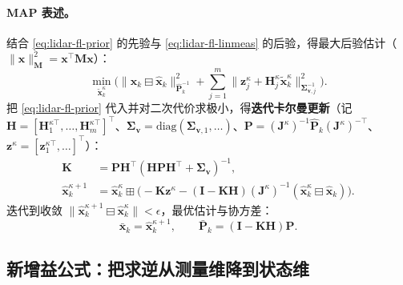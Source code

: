 \paragraph{MAP 表述。}
结合 \cref{eq:lidar-fl-prior} 的先验与 \cref{eq:lidar-fl-linmeas} 的后验，得最大后验估计（$\|\mathbf{x}\|^2_{\mathbf{M}}=\mathbf{x}^\top\mathbf{M}\mathbf{x}$）：
\begin{equation}
  \min_{\tilde{\mathbf{x}}^\kappa_k}\bigg(\big\|\mathbf{x}_k\boxminus\hat{\mathbf{x}}_k\big\|^2_{\hat{\mathbf{P}}_k^{-1}}+\sum_{j=1}^m\big\|\mathbf{z}^\kappa_j+\mathbf{H}^\kappa_j\tilde{\mathbf{x}}^\kappa_k\big\|^2_{\boldsymbol{\Sigma}_{\mathbf{v},j}^{-1}}\bigg).
  \label{eq:lidar-fl-map}
\end{equation}
把 \cref{eq:lidar-fl-prior} 代入并对二次代价求极小，得\textbf{迭代卡尔曼更新}（记 $\mathbf{H}=[\mathbf{H}^{\kappa\top}_1,\dots,\mathbf{H}^{\kappa\top}_m]^\top$、$\boldsymbol{\Sigma}_{\mathbf{v}}=\mathrm{diag}(\boldsymbol{\Sigma}_{\mathbf{v},1},\dots)$、$\mathbf{P}=(\mathbf{J}^\kappa)^{-1}\hat{\mathbf{P}}_k(\mathbf{J}^\kappa)^{-\top}$、$\mathbf{z}^\kappa=[\mathbf{z}^{\kappa\top}_1,\dots]^\top$）：
\begin{align}
  \mathbf{K}&=\mathbf{P}\mathbf{H}^\top(\mathbf{H}\mathbf{P}\mathbf{H}^\top+\boldsymbol{\Sigma}_{\mathbf{v}})^{-1}, \label{eq:lidar-fl-gain-old}\\
  \hat{\mathbf{x}}^{\kappa+1}_k&=\hat{\mathbf{x}}^\kappa_k\boxplus\Big(-\mathbf{K}\mathbf{z}^\kappa-(\mathbf{I}-\mathbf{K}\mathbf{H})(\mathbf{J}^\kappa)^{-1}(\hat{\mathbf{x}}^\kappa_k\boxminus\hat{\mathbf{x}}_k)\Big). \label{eq:lidar-fl-xupdate}
\end{align}
迭代到收敛 $\|\hat{\mathbf{x}}^{\kappa+1}_k\boxminus\hat{\mathbf{x}}^\kappa_k\|<\epsilon$，最优估计与协方差：
\begin{equation}
  \bar{\mathbf{x}}_k=\hat{\mathbf{x}}^{\kappa+1}_k,\qquad \bar{\mathbf{P}}_k=(\mathbf{I}-\mathbf{K}\mathbf{H})\mathbf{P}.
  \label{eq:lidar-fl-final}
\end{equation}

\subsection{新增益公式：把求逆从测量维降到状态维}
\label{sec:lidar-fl-gain}

